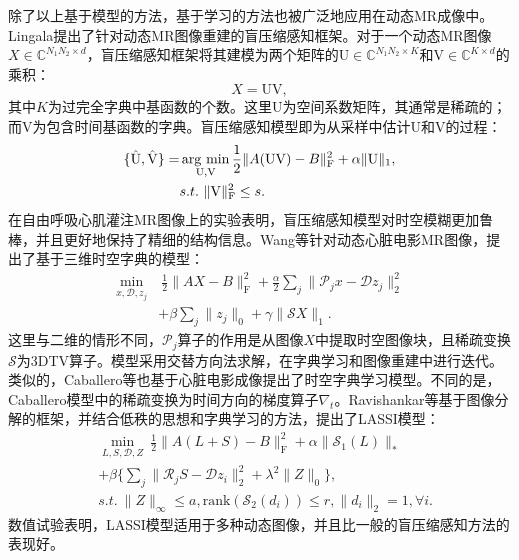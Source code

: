除了以上基于模型的方法，基于学习的方法也被广泛地应用在动态MR成像中。Lingala\cite{lingala2013blind}提出了针对动态MR图像重建的盲压缩感知框架。对于一个动态MR图像$X\in \mathbb{C}^{N_1N_2\times d}$，盲压缩感知框架将其建模为两个矩阵的$\mathrm{U}\in \mathbb{C}^{N_1N_2\times K}$和$\mathrm{V}\in \mathbb{C}^{K\times d}$的乘积：
$$X=\mathrm{UV},$$
其中$K$为过完全字典中基函数的个数。这里$\mathrm{U}$为空间系数矩阵，其通常是稀疏的；而$\mathrm{V}$为包含时间基函数的字典。盲压缩感知模型即为从采样中估计$\mathrm{U}$和$\mathrm{V}$的过程：
\begin{equation}
\begin{aligned}
	\{\hat{\mathrm{U}},\hat{\mathrm{V}}\}=&\argmin_{\mathrm{U},\mathrm{V}}\frac{1}{2}\|A(\mathrm{UV})-B\|_\mathrm{F}^2+\alpha\|\mathrm{U}\|_1,\\
	&s.t.\ \|\mathrm{V}\|_\mathrm{F}^2\leq s.
\end{aligned}
\end{equation}
在自由呼吸心肌灌注MR图像上的实验表明，盲压缩感知模型对时空模糊更加鲁棒，并且更好地保持了精细的结构信息。Wang\cite{wang2013compressed}等针对动态心脏电影MR图像，提出了基于三维时空字典的模型：
\begin{equation}
	\begin{aligned}
		\min_{x,\mathcal{D},z_j}&\ \frac{1}{2}\|AX-B\|_\mathrm{F}^2+\frac{\alpha}{2}\sum_j\|\mathcal{P}_jx-\mathcal{D}z_j\|_2^2\\
		&+\beta\sum_j\|z_j\|_0+\gamma\|\mathcal{S}X\|_1.
	\end{aligned}
\end{equation}
这里与二维的情形不同，$\mathcal{P}_j$算子的作用是从图像$X$中提取时空图像块，且稀疏变换$\mathcal{S}$为3DTV算子。模型采用交替方向法求解，在字典学习和图像重建中进行迭代。类似的，Caballero等\cite{caballero2014dictionary}也基于心脏电影成像提出了时空字典学习模型。不同的是，Caballero模型中的稀疏变换为时间方向的梯度算子$\nabla_t$。Ravishankar等\cite{ravishankar2015efficient}基于图像分解的框架，并结合低秩的思想和字典学习的方法，提出了LASSI模型：
\begin{equation}
	\begin{aligned}
		&\min_{L,S,\mathcal{D},Z}\ \frac{1}{2}\|A(L+S)-B\|_\mathrm{F}^2+\alpha\|\mathcal{S}_1(L)\|_*\\
		&+\beta\{\sum_j\|\mathcal{R}_jS-\mathcal{D}z_i\|^2_2+\lambda^2\|Z\|_0\},\\
		& s.t. \ \|Z\|_\infty\leq a, \mathrm{rank}(\mathcal{S}_2(d_i))\leq r, \|d_i\|_2=1,\forall i.
	\end{aligned}
\end{equation}
数值试验表明，LASSI模型适用于多种动态图像，并且比一般的盲压缩感知方法的表现好。

